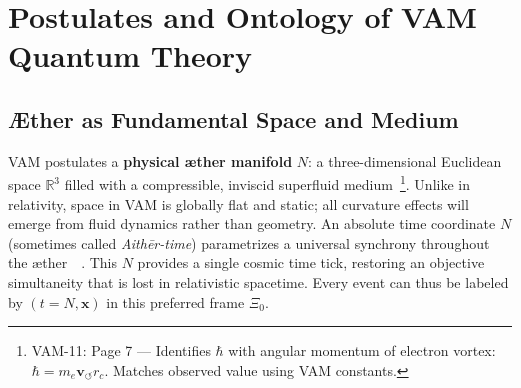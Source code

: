 \documentclass[a4paper,12pt]{article}
\begin{document}
\section{Postulates and Ontology of VAM Quantum Theory}
    \subsection{Æther as Fundamental Space and Medium}
    VAM postulates a \textbf{physical æther manifold} $N$: a three-dimensional Euclidean space $\mathbb{R}^3$ filled with a compressible, inviscid superfluid medium~\footnote{VAM-11: Page 7 — Identifies $\hbar$ with angular momentum of electron vortex: $\hbar = m_e \mathbf{v}_{\scriptscriptstyle\boldsymbol{\circlearrowleft}} r_c$. Matches observed value using VAM constants.}. Unlike in relativity, space in VAM is globally flat and static; all curvature effects will emerge from fluid dynamics rather than geometry. An absolute time coordinate $N$ (sometimes called \emph{Aithēr-time}) parametrizes a universal synchrony throughout the æther~~\cite{reference_15,reference_16}. This $N$ provides a single cosmic time tick, restoring an objective simultaneity that is lost in relativistic spacetime. Every event can thus be labeled by $(t=N, \mathbf{x})$ in this preferred frame $\Xi_0$.
\end{document}
